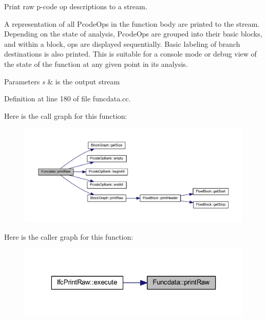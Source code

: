 Print raw p-\/code op descriptions to a stream. 

A representation of all Pcode\+Ops in the function body are printed to the stream. Depending on the state of analysis, Pcode\+Ops are grouped into their basic blocks, and within a block, ops are displayed sequentially. Basic labeling of branch destinations is also printed. This is suitable for a console mode or debug view of the state of the function at any given point in its analysis. 
\begin{DoxyParams}{Parameters}
{\em s} & is the output stream \\
\hline
\end{DoxyParams}


Definition at line 180 of file funcdata.\+cc.

Here is the call graph for this function\+:
\nopagebreak
\begin{figure}[H]
\begin{center}
\leavevmode
\includegraphics[width=350pt]{class_funcdata_a9a3cdbf385c382c10fc5b48f5842b418_cgraph}
\end{center}
\end{figure}
Here is the caller graph for this function\+:
\nopagebreak
\begin{figure}[H]
\begin{center}
\leavevmode
\includegraphics[width=323pt]{class_funcdata_a9a3cdbf385c382c10fc5b48f5842b418_icgraph}
\end{center}
\end{figure}
\mbox{\label{class_funcdata_ac150948163b641a4d138ef82bf213f4e}} 
